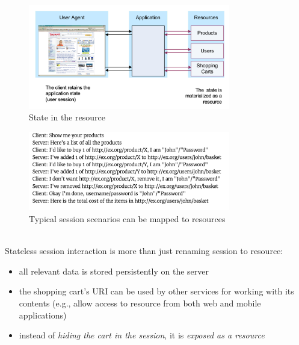 \documentclass[10pt,a4paper]{article}
\begin{document}
   \begin{figure}[ht!]
 \hfill \includegraphics[width=250pt]{images/state-resource}
 \hspace*{\fill}
 \caption{State in the resource}
 \end{figure}
 \pagebreak
    \begin{figure}[ht!]
 \hfill \includegraphics[width=250pt]{images/session-scenarios-example}
 \hspace*{\fill}
 \caption{Typical session scenarios can be mapped to resources}
 \end{figure} \\
 Stateless session interaction is more than just renaming session to resource:
 \begin{itemize}
 	\item all relevant data is stored persistently on the server
 	\item the shopping cart's URI can be used by other services for working with its contents (e.g., allow access to resource from both web and mobile applications)
 	\item instead of \textit{hiding the cart in the session}, it is \textit{exposed as a resource}
 \end{itemize}
\end{document}
